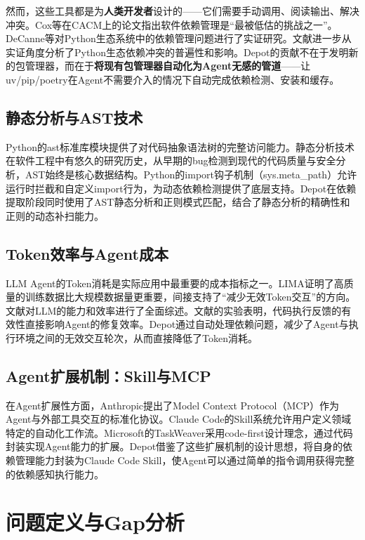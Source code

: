 \documentclass[10pt]{ctexart}
\begin{document}
然而，这些工具都是为\textbf{人类开发者}设计的——它们需要手动调用、阅读输出、解决冲突。Cox等\cite{cox2019dependency}在CACM上的论文指出软件依赖管理是“最被低估的挑战之一”。DeCanne等对Python生态系统中的依赖管理问题进行了实证研究。文献进一步从实证角度分析了Python生态依赖冲突的普遍性和影响。Depot的贡献不在于发明新的包管理器，而在于\textbf{将现有包管理器自动化为Agent无感的管道}——让uv/pip/poetry在Agent不需要介入的情况下自动完成依赖检测、安装和缓存。

\subsection{静态分析与AST技术}
Python的ast标准库模块\cite{pythonast2024}提供了对代码抽象语法树的完整访问能力。静态分析技术在软件工程中有悠久的研究历史，从早期的bug检测到现代的代码质量与安全分析，AST始终是核心数据结构。Python的import钩子机制（sys.meta\_path）允许运行时拦截和自定义import行为，为动态依赖检测提供了底层支持。Depot在依赖提取阶段同时使用了AST静态分析和正则模式匹配，结合了静态分析的精确性和正则的动态补扫能力。

\subsection{Token效率与Agent成本}
LLM Agent的Token消耗是实际应用中最重要的成本指标之一\cite{openai2024pricing,anthropic2024pricing}。LIMA证明了高质量的训练数据比大规模数据量更重要，间接支持了“减少无效Token交互”的方向。文献对LLM的能力和效率进行了全面综述。文献的实验表明，代码执行反馈的有效性直接影响Agent的修复效率。Depot通过自动处理依赖问题，减少了Agent与执行环境之间的无效交互轮次，从而直接降低了Token消耗。

\subsection{Agent扩展机制：Skill与MCP}
在Agent扩展性方面，Anthropic提出了Model Context Protocol（MCP）\cite{anthropic2025mcp}作为Agent与外部工具交互的标准化协议。Claude Code的Skill系统\cite{anthropic2025skillsystem}允许用户定义领域特定的自动化工作流。Microsoft的TaskWeaver\cite{qiao2024taskweaver}采用code-first设计理念，通过代码封装实现Agent能力的扩展。Depot借鉴了这些扩展机制的设计思想，将自身的依赖管理能力封装为Claude Code Skill，使Agent可以通过简单的指令调用获得完整的依赖感知执行能力。

\section{问题定义与Gap分析}
\end{document}
